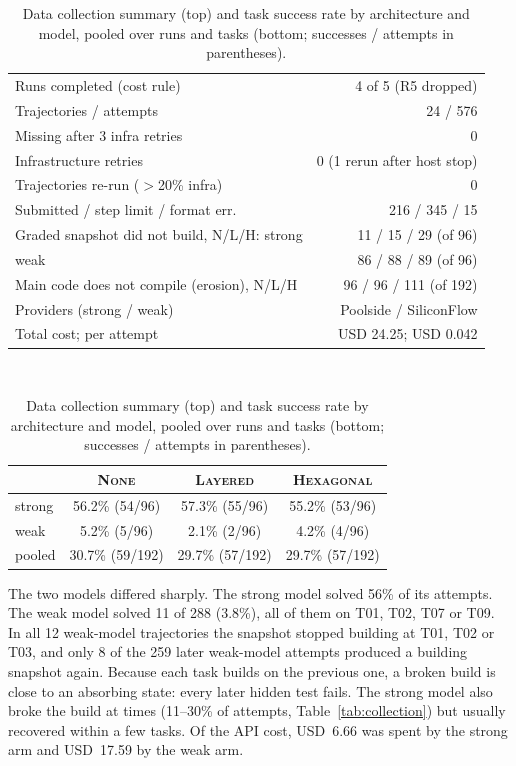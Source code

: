 \documentclass[10pt]{article}
\newcommand{\NONE}{\textsc{None}}
\newcommand{\LAY}{\textsc{Layered}}
\newcommand{\HEX}{\textsc{Hexagonal}}
\begin{document}
\begin{table}[tbp]\centering
\caption{Data collection summary (top) and task success rate by architecture and model, pooled
over runs and tasks (bottom; successes / attempts in parentheses).}
\label{tab:collection}\label{tab:success}
\footnotesize
\begin{tabular}[t]{@{}lr@{}}
\toprule
Runs completed (cost rule) & 4 of 5 (R5 dropped)\\
Trajectories / attempts & 24 / 576\\
Missing after 3 infra retries & 0\\
Infrastructure retries & 0 (1 rerun after host stop)\\
Trajectories re-run ($>$20\% infra) & 0\\
Submitted / step limit / format err. & 216 / 345 / 15\\
Graded snapshot did not build, N/L/H: strong & 11 / 15 / 29 (of 96)\\
\phantom{Graded snapshot did not build, N/L/H:} weak & 86 / 88 / 89 (of 96)\\
Main code does not compile (erosion), N/L/H & 96 / 96 / 111 (of 192)\\
Providers (strong / weak) & Poolside / SiliconFlow\\
Total cost; per attempt & USD 24.25; USD 0.042\\
\bottomrule
\end{tabular}\\[6pt]
\begin{tabular}[t]{@{}lccc@{}}
\toprule
 & \NONE & \LAY & \HEX\\
\midrule
strong & 56.2\% (54/96) & 57.3\% (55/96) & 55.2\% (53/96)\\
weak & 5.2\% (5/96) & 2.1\% (2/96) & 4.2\% (4/96)\\
pooled & 30.7\% (59/192) & 29.7\% (57/192) & 29.7\% (57/192)\\
\bottomrule
\end{tabular}
\end{table}

The two models differed sharply. The strong model solved 56\% of its attempts. The weak model
solved 11 of 288 (3.8\%), all of them on T01, T02, T07 or T09. In all 12 weak-model trajectories
the snapshot stopped building at T01, T02 or T03, and only 8 of the 259 later weak-model attempts
produced a building snapshot again. Because each task builds on the previous one, a broken build
is close to an absorbing state: every later hidden test fails. The strong model also broke the
build at times (11--30\% of attempts, Table~\ref{tab:collection}) but usually recovered within a
few tasks. Of the API cost, USD~6.66 was spent by the strong arm and USD~17.59 by the weak arm.
\end{document}
